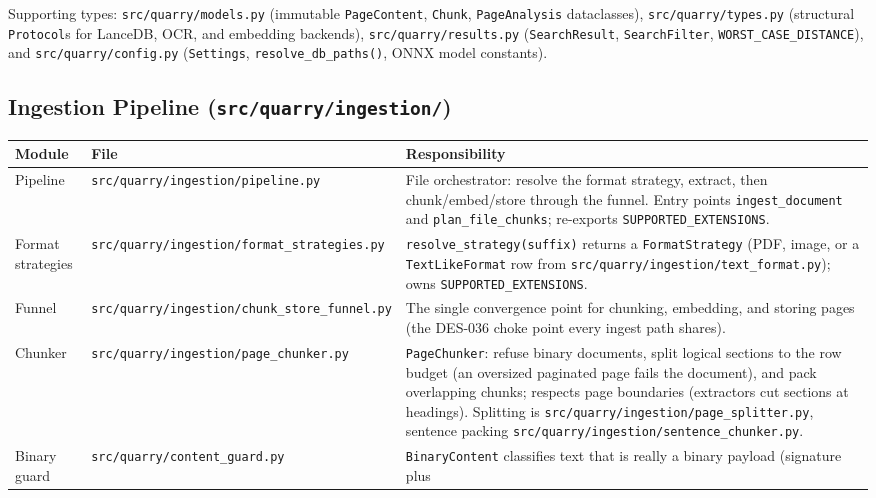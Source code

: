 \documentclass[a4paper,10pt]{article}
\newcommand{\modpath}[1]{\texttt{src/quarry/#1}}
\begin{document}
Supporting types: \modpath{models.py} (immutable \texttt{PageContent},
\texttt{Chunk}, \texttt{PageAnalysis} dataclasses), \modpath{types.py}
(structural \texttt{Protocol}s for LanceDB, OCR, and embedding
backends), \modpath{results.py} (\texttt{SearchResult},
\texttt{SearchFilter}, \texttt{WORST\_CASE\_DISTANCE}), and
\modpath{config.py} (\texttt{Settings}, \texttt{resolve\_db\_paths()},
ONNX model constants).

\subsection{Ingestion Pipeline (\modpath{ingestion/})}

\begin{center}
\begin{tabular}{llp{7cm}}
\toprule
\textbf{Module} & \textbf{File} & \textbf{Responsibility} \\
\midrule
Pipeline    & \modpath{ingestion/pipeline.py}    & File orchestrator:
              resolve the format strategy, extract, then chunk/embed/store
              through the funnel.  Entry points \texttt{ingest\_document}
              and \texttt{plan\_file\_chunks}; re-exports
              \texttt{SUPPORTED\_EXTENSIONS}. \\
Format strategies & \modpath{ingestion/format\_strategies.py} &
              \texttt{resolve\_strategy(suffix)} returns a
              \texttt{FormatStrategy} (PDF, image, or a
              \texttt{TextLikeFormat} row from
              \modpath{ingestion/text\_format.py}); owns
              \texttt{SUPPORTED\_EXTENSIONS}. \\
Funnel      & \modpath{ingestion/chunk\_store\_funnel.py} & The single
              convergence point for chunking, embedding, and storing pages
              (the DES-036 choke point every ingest path shares). \\
Chunker     & \modpath{ingestion/page\_chunker.py}     & \texttt{PageChunker}:
              refuse binary documents, split logical sections to the row
              budget (an oversized paginated page fails the document), and pack
              overlapping chunks; respects page boundaries (extractors cut
              sections at headings).  Splitting is
              \modpath{ingestion/page\_splitter.py}, sentence packing
              \modpath{ingestion/sentence\_chunker.py}. \\
Binary guard & \modpath{content\_guard.py} & \texttt{BinaryContent}
              classifies text that is really a binary payload (signature plus

\end{tabular}
\end{center}
\end{document}
